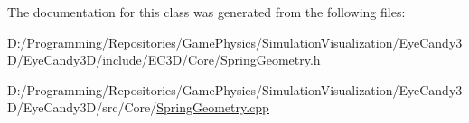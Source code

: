 The documentation for this class was generated from the following files\+:\begin{DoxyCompactItemize}
\item 
D\+:/\+Programming/\+Repositories/\+Game\+Physics/\+Simulation\+Visualization/\+Eye\+Candy3\+D/\+Eye\+Candy3\+D/include/\+E\+C3\+D/\+Core/\mbox{\hyperlink{_spring_geometry_8h}{Spring\+Geometry.\+h}}\item 
D\+:/\+Programming/\+Repositories/\+Game\+Physics/\+Simulation\+Visualization/\+Eye\+Candy3\+D/\+Eye\+Candy3\+D/src/\+Core/\mbox{\hyperlink{_spring_geometry_8cpp}{Spring\+Geometry.\+cpp}}\end{DoxyCompactItemize}
